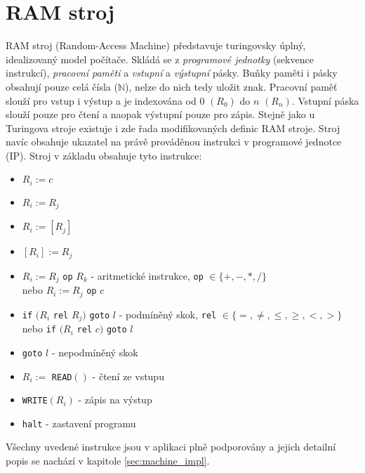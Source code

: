 \section{RAM stroj}
RAM stroj (Random-Access Machine) představuje turingovsky úplný, idealizovaný model počítače. 
Skládá se z \emph{programové jednotky} (sekvence instrukcí), \emph{pracovní paměti} a \emph{vstupní} a \emph{výstupní} pásky.
Buňky paměti i pásky obsahují pouze celá čísla ($\mathbb{N}$), nelze do nich tedy uložit znak. 
Pracovní paměť slouží pro vstup i výstup a je indexována od $0$ $(R_0)$ do $n$ $(R_n)$. Vstupní páska slouží pouze pro čtení a naopak výstupní pouze pro zápis.
Stejně jako u Turingova stroje existuje i zde řada modifikovaných definic RAM stroje.
Stroj navíc obsahuje ukazatel na právě prováděnou instrukci v programové jednotce (IP). Stroj v základu obsahuje tyto instrukce:
\begin{itemize}
	\item $R_i := c$
	\item $R_i := R_j$
	\item $R_i := [R_j]$
	\item $[R_i] := R_j$
	\item $R_i := R_j$ \texttt{op} $R_k$ - aritmetické instrukce, \texttt{op} $\in \{+, -, *, /\}$ \\ nebo $R_i := R_j$ \texttt{op} $c$
	\item \texttt{if} $(R_i$ \texttt{rel} $R_j)$ \texttt{goto} $l$ - podmíněný skok, \texttt{rel} $\in \{=, \neq, \leq, \geq, <, >\}$ \\ 
				nebo \texttt{if} $(R_i$ \texttt{rel} $c)$ \texttt{goto} $l$
	\item \texttt{goto} $l$ - nepodmíněný skok
	\item $R_i :=$ \texttt{READ}$()$ - čtení ze vstupu
	\item \texttt{WRITE}$(R_i)$ - zápis na výstup
	\item \texttt{halt} - zastavení programu
\end{itemize}
Všechny uvedené instrukce jsou v aplikaci plně podporovány a jejich detailní popis se nachází v kapitole \ref{sec:machine_impl}.

